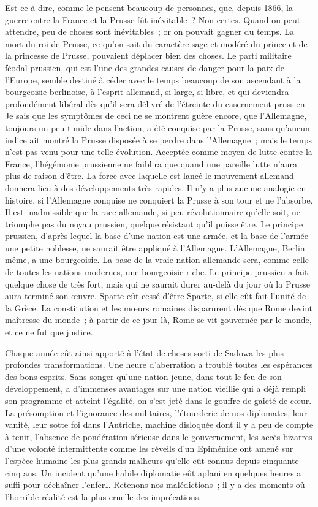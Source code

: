 \documentclass[french,twoside]{book} %
\begin{document}
Est-ce à dire, comme le pensent beaucoup de personnes, que, depuis 1866, la guerre entre la France et la Prusse fût inévitable ? Non certes. Quand on peut attendre, peu de choses sont inévitables ; or on pouvait gagner du temps. La mort du roi de Prusse, ce qu’on sait du caractère sage et modéré du prince et de la princesse de Prusse, pouvaient déplacer bien des choses. Le parti militaire féodal prussien, qui est l’une des grandes causes de danger pour la paix de l’Europe, semble destiné à céder avec le temps beaucoup de son ascendant à la bourgeoisie berlinoise, à l’esprit allemand, si large, si libre, et qui deviendra profondément libéral dès qu’il sera délivré de l’étreinte du casernement prussien. Je sais que les symptômes de ceci ne se montrent guère encore, que l’Allemagne, toujours un peu timide dans l’action, a été conquise par la Prusse, sans qu’aucun indice ait montré la Prusse disposée à se perdre dans l’Allemagne ; mais le temps n’est pas venu pour une telle évolution. Acceptée comme moyen de lutte contre la France, l’hégémonie prussienne ne faiblira que quand une pareille lutte n’aura plus de raison d’être. La force avec laquelle est lancé le mouvement allemand donnera lieu à des développements très rapides. Il n’y a plus aucune analogie en histoire, si l’Allemagne conquise ne conquiert la Prusse à son tour et ne l’absorbe. Il est inadmissible que la race allemande, si peu révolutionnaire qu’elle soit, ne triomphe pas du noyau prussien, quelque résistant qu’il puisse être. Le principe prussien, d’après lequel la base d’une nation est une armée, et la base de l’armée une petite noblesse, ne saurait être appliqué à l’Allemagne. L’Allemagne, Berlin même, a une bourgeoisie. La base de la vraie nation allemande sera, comme celle de toutes les nations modernes, une bourgeoisie riche. Le principe prussien a fait quelque chose de très fort, mais qui ne saurait durer au-delà du jour où la Prusse aura terminé son œuvre. Sparte eût cessé d’être Sparte, si elle eût fait l’unité de la Grèce. La constitution et les mœurs romaines disparurent dès que Rome devint maîtresse du monde ; à partir de ce jour-là, Rome se vit gouvernée par le monde, et ce ne fut que justice.\par
Chaque année eût ainsi apporté à l’état de choses sorti de Sadowa les plus profondes transformations. Une heure d’aberration a troublé toutes les espérances des bons esprits. Sans songer qu’une nation jeune, dans tout le feu de son développement, a d’immenses avantages sur une nation vieillie qui a déjà rempli son programme et atteint l’égalité, on s’est jeté dans le gouffre de gaieté de cœur. La présomption et l’ignorance des militaires, l’étourderie de nos diplomates, leur vanité, leur sotte foi dans l’Autriche, machine disloquée dont il y a peu de compte à tenir, l’absence de pondération sérieuse dans le gouvernement, les accès bizarres d’une volonté intermittente comme les réveils d’un Epiménide ont amené sur l’espèce humaine les plus grands malheurs qu’elle eût connus depuis cinquante-cinq ans. Un incident qu’une habile diplomatie eût aplani en quelques heures a suffi pour déchaîner l’enfer… Retenons nos malédictions ; il y a des moments où l’horrible réalité est la plus cruelle des imprécations.
\end{document}
